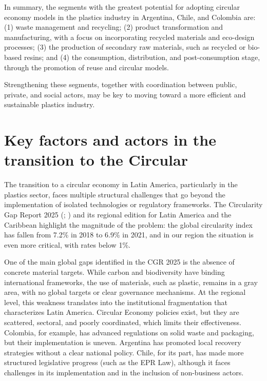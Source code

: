 \documentclass[
  12pt,
  oneside]{book}
\begin{document}
In summary, the segments with the greatest potential for adopting
circular economy models in the plastics industry in Argentina, Chile,
and Colombia are: (1) waste management and recycling; (2) product
transformation and manufacturing, with a focus on incorporating recycled
materials and eco-design processes; (3) the production of secondary raw
materials, such as recycled or bio-based resins; and (4) the
consumption, distribution, and post-consumption stage, through the
promotion of reuse and circular models.

Strengthening these segments, together with coordination between public,
private, and social actors, may be key to moving toward a more efficient
and sustainable plastics industry.

\section{Key factors and actors in the transition to the
Circular}\label{key-factors-and-actors-in-the-transition-to-the-circular}

The transition to a circular economy in Latin America, particularly in
the plastics sector, faces multiple structural challenges that go beyond
the implementation of isolated technologies or regulatory frameworks.
The Circularity Gap Report 2025
(;
) and its regional edition
for Latin America and the Caribbean highlight the magnitude of the
problem: the global circularity index has fallen from 7.2\% in 2018 to
6.9\% in 2021, and in our region the situation is even more critical,
with rates below 1\%.

One of the main global gaps identified in the CGR 2025 is the absence of
concrete material targets. While carbon and biodiversity have binding
international frameworks, the use of materials, such as plastic, remains
in a gray area, with no global targets or clear governance mechanisms.
At the regional level, this weakness translates into the institutional
fragmentation that characterizes Latin America. Circular Economy
policies exist, but they are scattered, sectoral, and poorly
coordinated, which limits their effectiveness. Colombia, for example,
has advanced regulations on solid waste and packaging, but their
implementation is uneven. Argentina has promoted local recovery
strategies without a clear national policy. Chile, for its part, has
made more structured legislative progress (such as the EPR Law),
although it faces challenges in its implementation and in the inclusion
of non-business actors.
\end{document}
